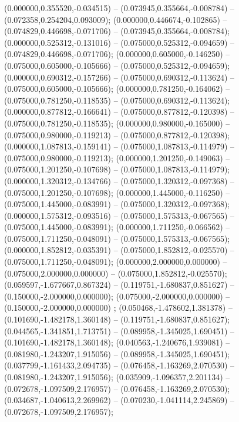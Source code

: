  (0.000000,0.355520,-0.034515) -- (0.073945,0.355664,-0.008784) -- (0.072358,0.254204,0.093009);
 (0.000000,0.446674,-0.102865) -- (0.074829,0.446698,-0.071706) -- (0.073945,0.355664,-0.008784);
 (0.000000,0.525312,-0.131016) -- (0.075000,0.525312,-0.094659) -- (0.074829,0.446698,-0.071706);
 (0.000000,0.605000,-0.146250) -- (0.075000,0.605000,-0.105666) -- (0.075000,0.525312,-0.094659);
 (0.000000,0.690312,-0.157266) -- (0.075000,0.690312,-0.113624) -- (0.075000,0.605000,-0.105666);
 (0.000000,0.781250,-0.164062) -- (0.075000,0.781250,-0.118535) -- (0.075000,0.690312,-0.113624);
 (0.000000,0.877812,-0.166641) -- (0.075000,0.877812,-0.120398) -- (0.075000,0.781250,-0.118535);
 (0.000000,0.980000,-0.165000) -- (0.075000,0.980000,-0.119213) -- (0.075000,0.877812,-0.120398);
 (0.000000,1.087813,-0.159141) -- (0.075000,1.087813,-0.114979) -- (0.075000,0.980000,-0.119213);
 (0.000000,1.201250,-0.149063) -- (0.075000,1.201250,-0.107698) -- (0.075000,1.087813,-0.114979);
 (0.000000,1.320312,-0.134766) -- (0.075000,1.320312,-0.097368) -- (0.075000,1.201250,-0.107698);
 (0.000000,1.445000,-0.116250) -- (0.075000,1.445000,-0.083991) -- (0.075000,1.320312,-0.097368);
 (0.000000,1.575312,-0.093516) -- (0.075000,1.575313,-0.067565) -- (0.075000,1.445000,-0.083991);
 (0.000000,1.711250,-0.066562) -- (0.075000,1.711250,-0.048091) -- (0.075000,1.575313,-0.067565);
 (0.000000,1.852812,-0.035391) -- (0.075000,1.852812,-0.025570) -- (0.075000,1.711250,-0.048091);
 (0.000000,2.000000,0.000000) -- (0.075000,2.000000,0.000000) -- (0.075000,1.852812,-0.025570);
 (0.059597,-1.677667,0.867324) -- (0.119751,-1.680837,0.851627) -- (0.150000,-2.000000,0.000000);
 (0.075000,-2.000000,0.000000) -- (0.150000,-2.000000,0.000000) ;
 (0.050468,-1.478602,1.381378) -- (0.101690,-1.482178,1.360148) -- (0.119751,-1.680837,0.851627);
 (0.044565,-1.341851,1.713751) -- (0.089958,-1.345025,1.690451) -- (0.101690,-1.482178,1.360148);
 (0.040563,-1.240676,1.939081) -- (0.081980,-1.243207,1.915056) -- (0.089958,-1.345025,1.690451);
 (0.037799,-1.161433,2.094735) -- (0.076458,-1.163269,2.070530) -- (0.081980,-1.243207,1.915056);
 (0.035909,-1.096357,2.201134) -- (0.072678,-1.097509,2.176957) -- (0.076458,-1.163269,2.070530);
 (0.034687,-1.040613,2.269962) -- (0.070230,-1.041114,2.245869) -- (0.072678,-1.097509,2.176957);

